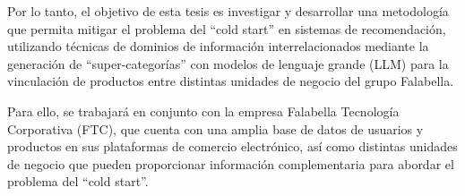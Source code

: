 Por lo tanto, el objetivo de esta tesis es investigar y desarrollar una metodología que permita mitigar el problema del \enquote{cold start} en sistemas de recomendación, utilizando técnicas de dominios de información interrelacionados mediante la generación de \enquote{super-categorías} con modelos de lenguaje grande (LLM) para la vinculación de productos entre distintas unidades de negocio del grupo Falabella.

Para ello, se trabajará en conjunto con la empresa Falabella Tecnología Corporativa (FTC), que cuenta con una amplia base de datos de usuarios y productos en sus plataformas de comercio electrónico, así como distintas unidades de negocio que pueden proporcionar información complementaria para abordar el problema del \enquote{cold start}.